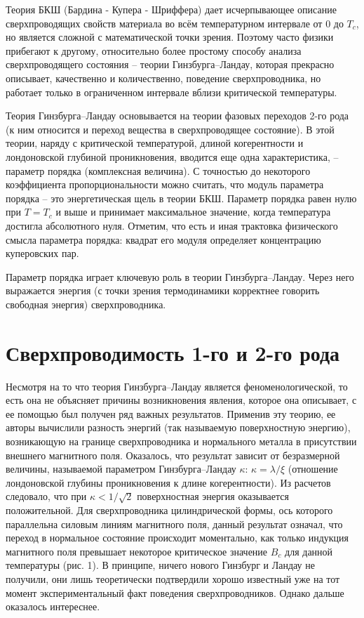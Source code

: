 Теория БКШ (Бардина - Купера - Шриффера) дает исчерпывающее описание 
сверхпроводящих свойств материала во всём температурном интервале от \( 0 \) 
до \( T_c \), но является сложной с математической точки зрения. Поэтому часто 
физики прибегают к другому, относительно более простому способу анализа 
сверхпроводящего состояния -- теории Гинзбурга–Ландау, которая прекрасно 
описывает, качественно и количественно, поведение сверхпроводника, но 
работает только в ограниченном интервале вблизи критической температуры.

Теория Гинзбурга–Ландау основывается на теории фазовых переходов 2-го рода 
(к ним относится и переход вещества в сверхпроводящее состояние). В этой 
теории, наряду с критической температурой, длиной когерентности и 
лондоновской глубиной проникновения, вводится еще одна характеристика, -- 
параметр порядка (комплексная величина). С точностью до некоторого 
коэффициента пропорциональности можно считать, что модуль параметра порядка -- 
это энергетическая щель в теории БКШ. Параметр порядка равен нулю при 
\( T = T_c \) и выше и принимает максимальное значение, когда температура 
достигла абсолютного нуля. Отметим, что есть и иная трактовка физического 
смысла параметра порядка: квадрат его модуля определяет концентрацию 
куперовских пар.

Параметр порядка играет ключевую роль в теории Гинзбурга–Ландау. Через него 
выражается энергия (с точки зрения термодинамики корректнее говорить 
свободная энергия) сверхпроводника. 

\section{Сверхпроводимость 1-го и 2-го рода}

Несмотря на то что теория Гинзбурга–Ландау является феноменологической, то 
есть она не объясняет причины возникновения явления, которое она описывает, с 
ее помощью был получен ряд важных результатов. Применив эту теорию, ее авторы 
вычислили разность энергий (так называемую поверхностную энергию), 
возникающую на границе сверхпроводника и нормального металла в присутствии 
внешнего магнитного поля. Оказалось, что результат зависит от безразмерной 
величины, называемой параметром Гинзбурга–Ландау \( \kappa \): 
\( \kappa = \lambda/\xi \) (отношение лондоновской глубины проникновения к 
длине когерентности). Из расчетов следовало, что при \( \kappa < 1/\sqrt{2} \) 
поверхностная энергия оказывается положительной. Для сверхпроводника 
цилиндрической формы, ось которого параллельна силовым линиям магнитного поля, 
данный результат означал, что переход в нормальное состояние происходит 
моментально, как только индукция магнитного поля превышает некоторое 
критическое значение \( B_c \) для данной температуры (рис. 1). В принципе, 
ничего нового Гинзбург и Ландау не получили, они лишь теоретически подтвердили 
хорошо известный уже на тот момент экспериментальный факт поведения 
сверхпроводников. Однако дальше оказалось интереснее.

